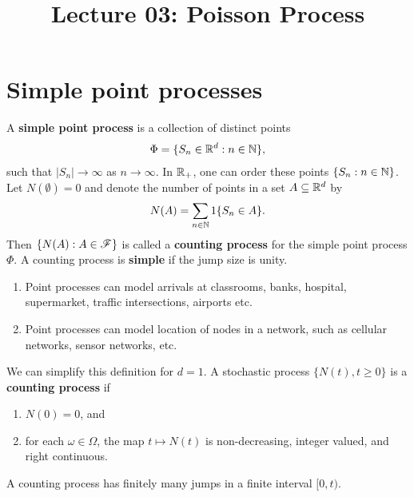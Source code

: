 \documentclass[a4paper,10pt,english]{article}
\title{Lecture 03: Poisson Process}
\author{}
\begin{document}
\maketitle

\section{Simple point processes}
A \textbf{simple point process} is a collection of distinct points 
\begin{align*}
\Phi = \{S_n \in \mathbb{R}^d: n \in \mathbb{N}\},
\end{align*}
such that $|S_n| \to \infty$ as $n \to \infty$.  
In $\mathbb{R}_+$, one can order these points $\{S_n: n \in \mathbb{N}\}$. 
Let $N(\emptyset) =0$ and denote the number of points in a set $A \subseteq \mathbb{R}^d$ by
\begin{align*}
N(A)= \sum_{n \in \mathbb{N}}1\{S_n \in A\}. 
\end{align*} 
Then $\{N(A): A \in \mathscr{F}\}$ is called a \textbf{counting process} for the simple point process $\Phi$. 
A counting process is \textbf{simple} if the jump size is unity.
\begin{shaded*}
\begin{enumerate}
\item Point processes can model arrivals at classrooms, banks, hospital, supermarket, traffic intersections, airports etc.
\item Point processes can model location of nodes in a network, such as cellular networks, sensor networks, etc.
\end{enumerate}
\end{shaded*}
We can simplify this definition for $d=1$. 
A stochastic process $\{N(t), t\geqslant 0\}$ is a \textbf{counting process} if
\begin{enumerate}
  \item $N(0) = 0$, and 
  \item for each $\omega \in \Omega$, the map $t\mapsto N(t)$ is non-decreasing, integer valued, and right continuous.%
\end{enumerate}

\begin{lem} 
A counting process has finitely many jumps in a finite interval $[0,t)$.
\end{lem}
\end{document}
